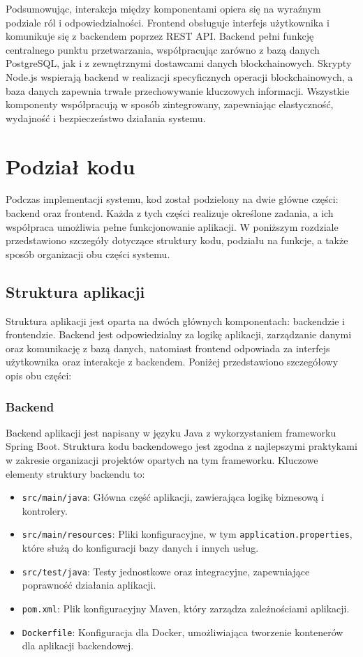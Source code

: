 Podsumowując, interakcja między komponentami opiera się na wyraźnym podziale ról i odpowiedzialności. Frontend obsługuje interfejs użytkownika i komunikuje się z backendem poprzez REST API. Backend pełni funkcję centralnego punktu przetwarzania, współpracując zarówno z bazą danych PostgreSQL, jak i z zewnętrznymi dostawcami danych blockchainowych. Skrypty Node.js wspierają backend w realizacji specyficznych operacji blockchainowych, a baza danych zapewnia trwałe przechowywanie kluczowych informacji. Wszystkie komponenty współpracują w sposób zintegrowany, zapewniając elastyczność, wydajność i bezpieczeństwo działania systemu.

\section{Podział kodu}

Podczas implementacji systemu, kod został podzielony na dwie główne części: backend oraz frontend. Każda z tych części realizuje określone zadania, a ich współpraca umożliwia pełne funkcjonowanie aplikacji. W poniższym rozdziale przedstawiono szczegóły dotyczące struktury kodu, podziału na funkcje, a także sposób organizacji obu części systemu.

\subsection{Struktura aplikacji}

Struktura aplikacji jest oparta na dwóch głównych komponentach: backendzie i frontendzie. Backend jest odpowiedzialny za logikę aplikacji, zarządzanie danymi oraz komunikację z bazą danych, natomiast frontend odpowiada za interfejs użytkownika oraz interakcje z backendem. Poniżej przedstawiono szczegółowy opis obu części:

\subsubsection{Backend}
Backend aplikacji jest napisany w języku Java z wykorzystaniem frameworku Spring Boot. Struktura kodu backendowego jest zgodna z najlepszymi praktykami w zakresie organizacji projektów opartych na tym frameworku. Kluczowe elementy struktury backendu to:
\begin{itemize}
    \item \texttt{src/main/java}: Główna część aplikacji, zawierająca logikę biznesową i kontrolery.
    \item \texttt{src/main/resources}: Pliki konfiguracyjne, w tym \texttt{application.properties}, które służą do konfiguracji bazy danych i innych usług.
    \item \texttt{src/test/java}: Testy jednostkowe oraz integracyjne, zapewniające poprawność działania aplikacji.
    \item \texttt{pom.xml}: Plik konfiguracyjny Maven, który zarządza zależnościami aplikacji.
    \item \texttt{Dockerfile}: Konfiguracja dla Docker, umożliwiająca tworzenie kontenerów dla aplikacji backendowej.
\end{itemize}

